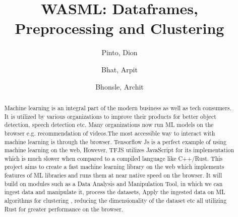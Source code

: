 \documentclass[a4paper,12pt]{report}
\title{WASML: Dataframes, Preprocessing and Clustering}
\author{
  Pinto, Dion\\
  \and
  Bhat, Arpit\\
  \and
  Bhonsle, Archit\\
}
\begin{document}
\maketitle
\tableofcontents

\begin{abstract}
  Machine learning is an integral part of the modern business as well as
  tech consumers. It is utilized by various organizations to improve their
  products for better object detection, speech detection etc. Many
  organizations now run ML models on the browser e.g. recommendation of
  videos.The most accessible way to interact with machine learning is
  through the browser. Tensorflow Js is a perfect example of using machine
  learning on the web, However, TFJS utilizes JavaScript for its
  implementation which is much slower when compared to a compiled language
  like C++/Rust.
  This project aims to create a fast machine learning library on the web
  which implements features of ML libraries and runs them at near native
  speed on the browser. It will build on modules such as a Data Analysis
  and Manipulation Tool, in which we can ingest data and manipulate it,
  process the datasets, Apply the ingested data on ML algorithms for
  clustering , reducing the dimensionality of the dataset etc all utilizing
  Rust for greater performance on the browser.
\end{abstract}
\end{document}
